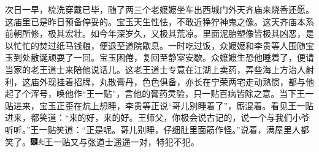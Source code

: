 次日一早，梳洗穿戴已毕，随了两三个老嬷嬷坐车出西城门外天齐庙来烧香还愿。这庙里已是昨日预备停妥的。宝玉天生性怯，不敢近狰狞神鬼之像。这天齐庙本系前朝所修，极其宏壮。如今年深岁久，又极其荒凉。里面泥胎塑像皆极其凶恶，是以忙忙的焚过纸马钱粮，便退至道院歇息。一时吃过饭，众嬷嬷和李贵等人围随宝玉到处散诞顽耍了一回。宝玉困倦，复回至静室安歇。众嬷嬷生恐他睡着了，便请当家的老王道士来陪他说话儿。这老王道士专意在江湖上卖药，弄些海上方治人射利，这庙外现挂着招牌，丸散膏丹，色色俱备，亦长在宁荣两宅走动熟惯，都与他起了个浑号，唤他作“王一贴”，言他的膏药灵验，只一贴百病皆除之意。当下王一贴进来，宝玉正歪在炕上想睡，李贵等正说“哥儿别睡着了”，厮混着。看见王一贴进来，都笑道：“来的好，来的好。王师父，你极会说古记的，说一个与我们小爷听听。”王一贴笑道：“正是呢。哥儿别睡，仔细肚里面筋作怪。”说着，满屋里人都笑了。{\includegraphics[width=3mm]{../Images/00004}\includegraphics[width=3mm]{../Images/00012}\footnotesize \kaishu 王一贴又与张道士遥遥一对，特犯不犯。}

